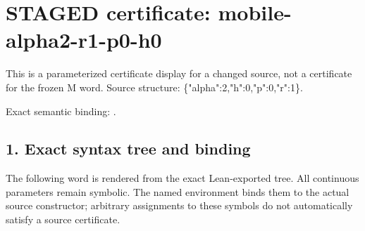\section*{STAGED certificate: mobile-alpha2-r1-p0-h0}
This is a parameterized certificate display for a changed source, not a certificate for the frozen M word.
Source structure: \{"alpha":2,"h":0,"p":0,"r":1\}.

\noindent Exact semantic binding: .

\subsection*{1. Exact syntax tree and binding}
The following word is rendered from the exact Lean-exported tree. All continuous parameters remain symbolic. The named environment binds them to the actual source constructor; arbitrary assignments to these symbols do not automatically satisfy a source certificate.

